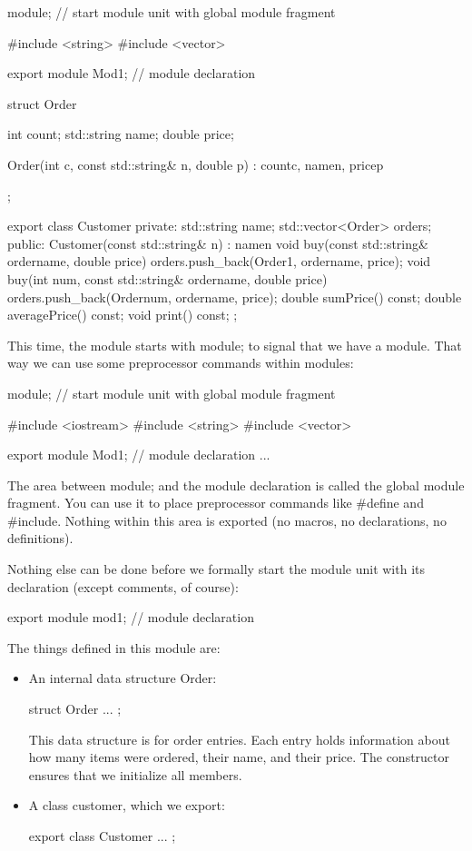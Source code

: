 \begin{cpp}
module; // start module unit with global module fragment

#include <string>
#include <vector>

export module Mod1; // module declaration

struct Order {
	int count;
	std::string name;
	double price;
	
	Order(int c, const std::string& n, double p)
	: count{c}, name{n}, price{p} {
	}
};

export class Customer {
private:
	std::string name;
	std::vector<Order> orders;
public:
	Customer(const std::string& n)
	: name{n} {
	}
	void buy(const std::string& ordername, double price) {
		orders.push_back(Order{1, ordername, price});
	}
	void buy(int num, const std::string& ordername, double price) {
		orders.push_back(Order{num, ordername, price});
	}
	double sumPrice() const;
	double averagePrice() const;
	void print() const;
};
\end{cpp}

This time, the module starts with module; to signal that we have a module. That way we can use some preprocessor commands within modules:

\begin{cpp}
module; // start module unit with global module fragment

#include <iostream>
#include <string>
#include <vector>

export module Mod1; // module declaration
...
\end{cpp}

The area between module; and the module declaration is called the global module fragment. You can use it to place preprocessor commands like \#define and \#include. Nothing within this area is exported (no macros, no declarations, no definitions).

Nothing else can be done before we formally start the module unit with its declaration (except comments, of course):

\begin{cpp}
export module mod1; // module declaration
\end{cpp}

The things defined in this module are:

\begin{itemize}
\item 
An internal data structure Order:

\begin{cpp}
struct Order {
	...
};
\end{cpp}

This data structure is for order entries. Each entry holds information about how many items were ordered, their name, and their price. The constructor ensures that we initialize all members.

\item 
A class customer, which we export:

\begin{cpp}
export class Customer {
	...
};
\end{cpp}
\end{itemize}

